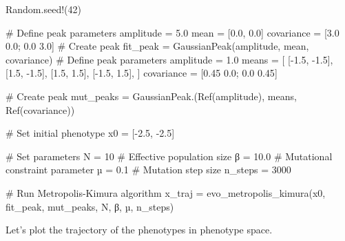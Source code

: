 \documentclass[
]{scrartcl}
\newenvironment{Shaded}{\begin{snugshade}}{\end{snugshade}}
\newcommand{\BuiltInTok}[1]{\textcolor[rgb]{0.00,0.23,0.31}{#1}}
\newcommand{\CommentTok}[1]{\textcolor[rgb]{0.37,0.37,0.37}{#1}}
\newcommand{\FloatTok}[1]{\textcolor[rgb]{0.68,0.00,0.00}{#1}}
\newcommand{\FunctionTok}[1]{\textcolor[rgb]{0.28,0.35,0.67}{#1}}
\newcommand{\NormalTok}[1]{\textcolor[rgb]{0.00,0.23,0.31}{#1}}
\newcommand{\OperatorTok}[1]{\textcolor[rgb]{0.37,0.37,0.37}{#1}}
\begin{document}
\begin{Shaded}
\begin{Highlighting}[]
\BuiltInTok{Random}\NormalTok{.}\FunctionTok{seed!}\NormalTok{(}\FloatTok{42}\NormalTok{)}

\CommentTok{\# Define peak parameters}
\NormalTok{amplitude }\OperatorTok{=} \FloatTok{5.0}
\NormalTok{mean }\OperatorTok{=}\NormalTok{ [}\FloatTok{0.0}\NormalTok{, }\FloatTok{0.0}\NormalTok{]}
\NormalTok{covariance }\OperatorTok{=}\NormalTok{ [}\FloatTok{3.0} \FloatTok{0.0}\NormalTok{; }\FloatTok{0.0} \FloatTok{3.0}\NormalTok{]}
\CommentTok{\# Create peak}
\NormalTok{fit\_peak }\OperatorTok{=} \FunctionTok{GaussianPeak}\NormalTok{(amplitude, mean, covariance)}
\CommentTok{\# Define peak parameters}
\NormalTok{amplitude }\OperatorTok{=} \FloatTok{1.0}
\NormalTok{means }\OperatorTok{=}\NormalTok{ [}
\NormalTok{    [}\OperatorTok{{-}}\FloatTok{1.5}\NormalTok{, }\OperatorTok{{-}}\FloatTok{1.5}\NormalTok{],}
\NormalTok{    [}\FloatTok{1.5}\NormalTok{, }\OperatorTok{{-}}\FloatTok{1.5}\NormalTok{],}
\NormalTok{    [}\FloatTok{1.5}\NormalTok{, }\FloatTok{1.5}\NormalTok{],}
\NormalTok{    [}\OperatorTok{{-}}\FloatTok{1.5}\NormalTok{, }\FloatTok{1.5}\NormalTok{],}
\NormalTok{]}
\NormalTok{covariance }\OperatorTok{=}\NormalTok{ [}\FloatTok{0.45} \FloatTok{0.0}\NormalTok{; }\FloatTok{0.0} \FloatTok{0.45}\NormalTok{]}

\CommentTok{\# Create peak}
\NormalTok{mut\_peaks }\OperatorTok{=} \FunctionTok{GaussianPeak}\NormalTok{.(}\FunctionTok{Ref}\NormalTok{(amplitude), means, }\FunctionTok{Ref}\NormalTok{(covariance))}

\CommentTok{\# Set initial phenotype}
\NormalTok{x0 }\OperatorTok{=}\NormalTok{ [}\OperatorTok{{-}}\FloatTok{2.5}\NormalTok{, }\OperatorTok{{-}}\FloatTok{2.5}\NormalTok{]}

\CommentTok{\# Set parameters}
\NormalTok{N }\OperatorTok{=} \FloatTok{10} \CommentTok{\# Effective population size }
\NormalTok{β }\OperatorTok{=} \FloatTok{10.0}    \CommentTok{\# Mutational constraint parameter}
\NormalTok{µ }\OperatorTok{=} \FloatTok{0.1}    \CommentTok{\# Mutation step size}
\NormalTok{n\_steps }\OperatorTok{=} \FloatTok{3000}

\CommentTok{\# Run Metropolis{-}Kimura algorithm}
\NormalTok{x\_traj }\OperatorTok{=} \FunctionTok{evo\_metropolis\_kimura}\NormalTok{(x0, fit\_peak, mut\_peaks, N, β, µ, n\_steps)}
\end{Highlighting}
\end{Shaded}

Let's plot the trajectory of the phenotypes in phenotype space.
\end{document}
